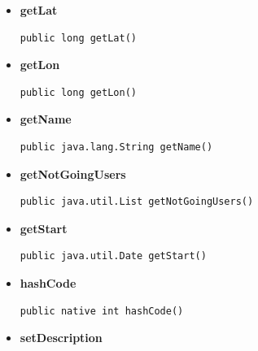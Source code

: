 \documentclass[11pt,a4paper]{article}
\begin{document}
{{{{\begin{itemize}
{}%
\item{ 
\hypertarget{edu.kit.pse17.go_app.PersistenceLayer.GoEntity.getLat()}{{\bf  getLat}\\}
\begin{lstlisting}[frame=none]
public long getLat()\end{lstlisting} %
}%
\item{ 
\hypertarget{edu.kit.pse17.go_app.PersistenceLayer.GoEntity.getLon()}{{\bf  getLon}\\}
\begin{lstlisting}[frame=none]
public long getLon()\end{lstlisting} %
}%
\item{ 
\hypertarget{edu.kit.pse17.go_app.PersistenceLayer.GoEntity.getName()}{{\bf  getName}\\}
\begin{lstlisting}[frame=none]
public java.lang.String getName()\end{lstlisting} %
}%
\item{ 
\hypertarget{edu.kit.pse17.go_app.PersistenceLayer.GoEntity.getNotGoingUsers()}{{\bf  getNotGoingUsers}\\}
\begin{lstlisting}[frame=none]
public java.util.List getNotGoingUsers()\end{lstlisting} %
}%
\item{ 
\hypertarget{edu.kit.pse17.go_app.PersistenceLayer.GoEntity.getStart()}{{\bf  getStart}\\}
\begin{lstlisting}[frame=none]
public java.util.Date getStart()\end{lstlisting} %
}%
\item{ 
\hypertarget{edu.kit.pse17.go_app.PersistenceLayer.GoEntity.hashCode()}{{\bf  hashCode}\\}
\begin{lstlisting}[frame=none]
public native int hashCode()\end{lstlisting} %
}%
\item{ 
\hypertarget{edu.kit.pse17.go_app.PersistenceLayer.GoEntity.setDescription(java.lang.String)}{{\bf  setDescription}\\}
\begin{lstlisting}[frame=none]

\end{lstlisting}}
\end{itemize}}}}}
\end{document}
